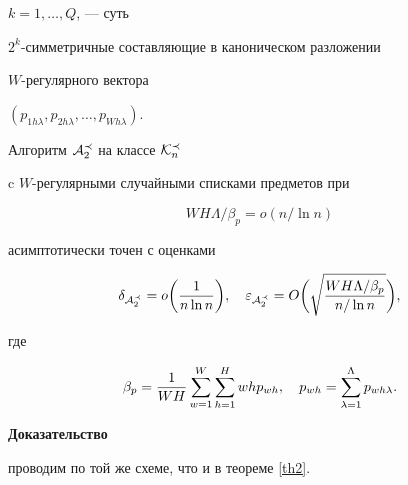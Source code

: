 $k=1, \dotsc,Q$, --- суть 


$2^{k}$-симметричные составляющие в каноническом разложении


$W$-регулярного вектора 


$(p_{1h\lambda},p_{2h\lambda},\dotsc,p_{Wh\lambda})$.





\begin{thm}


\label{th3}


Алгоритм ${\cal A}_{2}^{\prec}$ на классе ${\cal K}_{n}^{\prec}$


c $W$-регулярными случайными списками предметов при 


\begin{equation}


\label{e17p}


WH\Lambda / \beta_{p} = o(n/ \ln n)


\end{equation}


асимптотически точен с оценками


$$


\delta_{{\cal A}_{2}^{\prec}}


=o\biggl(\frac {1}{n \ln n}\biggr),\quad


\eps_{{\cal A}_{2}^{\prec}}=


O\biggl(\sqrt {\frac {WH\Lambda / \beta_{p}}{n/\ln n}} \biggr), 


$$


где


$$


\beta_{p}=\frac {1}{WH} 


\SWH whp_{wh},


\quad p_{wh}= \SL p_{wh\lambda}.


$$


\end{thm}





{\bf Доказательство}


проводим по той же схеме, что и в теореме \ref{th2}.


